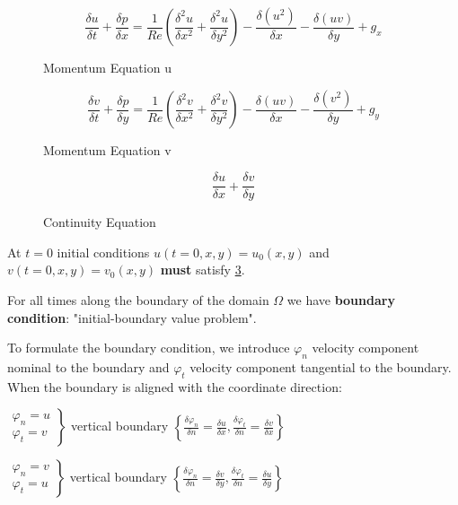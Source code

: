 \documentclass[a4paper,11pt]{scrartcl}
\begin{document}
\begin{figure}[H]
	\centering
	\[ \frac{\delta u}{\delta t} + \frac{\delta p}{\delta x} = \frac{1}{Re} \left( \frac{\delta^2 u}{\delta x^2} + \frac{\delta^2 u}{\delta y^2}\right) - \frac{\delta (u^2)}{\delta x} - \frac{\delta (uv)}{\delta y} + g_x\]
    \renewcommand{\thefigure}{2.2a}
	\caption{Momentum Equation u}
	\label{fig:momentuma}
\end{figure}
\begin{figure}[H]
	\centering
	\[ \frac{\delta v}{\delta t} + \frac{\delta p}{\delta y} = \frac{1}{Re} \left( \frac{\delta^2 v}{\delta x^2} + \frac{\delta^2 v}{\delta y^2}\right) - \frac{\delta (uv)}{\delta x} - \frac{\delta (v^2)}{\delta y} + g_y\]
    \renewcommand{\thefigure}{2.2b}
	\caption{Momentum Equation v}
	\label{fig:momentumb}
\end{figure}
\begin{figure}[H]
	\centering
	\[ \frac{\delta u}{\delta x} + \frac{\delta v}{\delta y}\]
    \renewcommand{\thefigure}{2.2c}
	\caption{Continuity Equation}
	\label{fig:cont}
\end{figure}


At $t = 0$ initial conditions $u(t=0, x,y) = u_0(x,y)$ and $v(t=0,x,y) = v_0(x,y)$ \textbf{must} satisfy \ref{fig:cont}.


For all times along the boundary of the domain $\Omega$ we have \textbf{boundary condition}: "initial-boundary value problem".

To formulate the boundary condition, we introduce $\varphi_n$ velocity component nominal to the boundary and $\varphi_t$ velocity component tangential to the boundary. When the boundary is aligned with the coordinate direction: 


$\left.\begin{matrix}
\varphi_n = u\\
\varphi_t = v
\end{matrix} \right\rbrace$ vertical boundary $\left\lbrace \frac{\delta \varphi_n}{\delta n} = \frac{\delta u}{\delta x},\frac{\delta \varphi_t}{\delta n} = \frac{\delta v}{\delta x} \right\rbrace$

$\left.\begin{matrix}
\varphi_n = v\\
\varphi_t = u
\end{matrix} \right\rbrace$ vertical boundary $\left\lbrace \frac{\delta \varphi_n}{\delta n} = \frac{\delta v}{\delta y},\frac{\delta \varphi_t}{\delta n} = \frac{\delta u}{\delta y} \right\rbrace$
\end{document}
